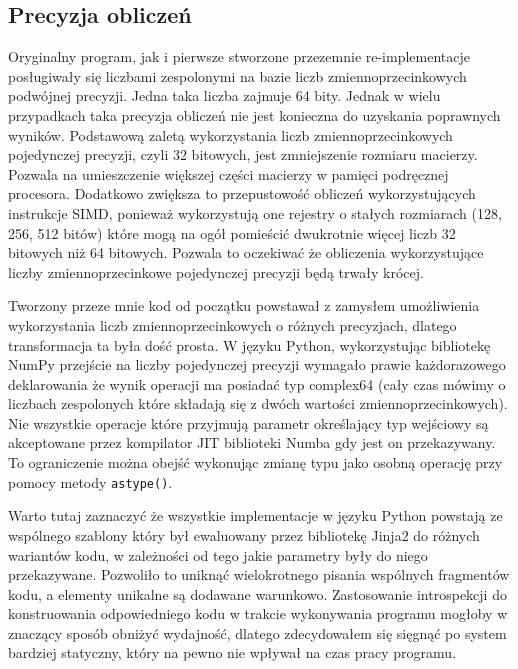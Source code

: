 \documentclass[11pt, a4paper]{article}
\newcommand{\code}[1]{\texttt{#1}}
\begin{document}
\begin{sloppypar}
    \subsection{Precyzja obliczeń}
    Oryginalny program, jak i pierwsze stworzone przezemnie re-implementacje posługiwały
    się liczbami zespolonymi na bazie liczb zmiennoprzecinkowych podwójnej precyzji.
    Jedna taka liczba zajmuje 64 bity. Jednak w wielu przypadkach taka precyzja obliczeń
    nie jest konieczna do uzyskania poprawnych wyników. Podstawową zaletą wykorzystania
    liczb zmiennoprzecinkowych pojedynczej precyzji, czyli 32 bitowych, jest
    zmniejszenie rozmiaru macierzy. Pozwala na umieszczenie większej części macierzy w pamięci
    podręcznej procesora. Dodatkowo zwiększa to przepustowość obliczeń wykorzystujących
    instrukcje SIMD, ponieważ wykorzystują one rejestry o stałych rozmiarach (128, 256,
    512 bitów) które mogą na ogół pomieścić dwukrotnie więcej liczb 32 bitowych niż 64 bitowych.
    Pozwala to oczekiwać że obliczenia wykorzystujące liczby zmiennoprzecinkowe
    pojedynczej precyzji będą trwały krócej.

    Tworzony przeze mnie kod od początku powstawał z zamysłem umożliwienia wykorzystania
    liczb zmiennoprzecinkowych o różnych precyzjach, dlatego transformacja ta była dość prosta.
    W języku Python, wykorzystując bibliotekę NumPy przejście na liczby pojedynczej precyzji
    wymagało prawie każdorazowego deklarowania że wynik operacji ma posiadać typ complex64
    (cały czas mówimy o liczbach zespolonych które składają się z dwóch wartości
    zmiennoprzecinkowych). Nie wszystkie operacje które przyjmują parametr określający
    typ wejściowy są akceptowane przez kompilator JIT biblioteki Numba gdy jest on
    przekazywany. To ograniczenie można obejść wykonując zmianę typu jako osobną operację
    przy pomocy metody \code{astype()}.

    Warto tutaj zaznaczyć że wszystkie implementacje w języku Python powstają ze
    wspólnego szablony który był ewaluowany przez bibliotekę Jinja2 do różnych wariantów
    kodu, w zależności od tego jakie parametry były do niego przekazywane. Pozwoliło to
    uniknąć wielokrotnego pisania wspólnych fragmentów kodu, a elementy unikalne są dodawane
    warunkowo. Zastosowanie introspekcji do konstruowania odpowiedniego kodu w trakcie
    wykonywania programu mogłoby w znaczący sposób obniżyć wydajność, dlatego zdecydowałem
    się sięgnąć po system bardziej statyczny, który na pewno nie wpływał na czas pracy
    programu.


\end{sloppypar}
\end{document}
